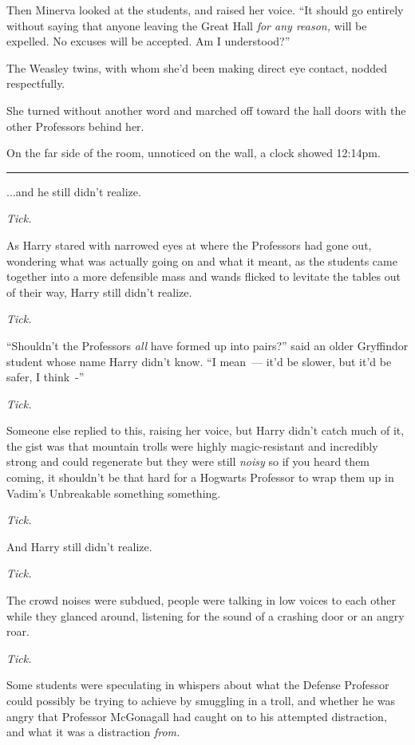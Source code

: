 Then Minerva looked at the students, and raised her voice. ``It should go entirely without saying that anyone leaving the Great Hall \emph{for any reason,} will be expelled. No excuses will be accepted. Am I understood?''

The Weasley twins, with whom she'd been making direct eye contact, nodded respectfully.

She turned without another word and marched off toward the hall doors with the other Professors behind her.

On the far side of the room, unnoticed on the wall, a clock showed 12:14pm.

\begin{center}\rule{3in}{0.4pt}\end{center}

...and he still didn't realize.

\emph{Tick.}

As Harry stared with narrowed eyes at where the Professors had gone out, wondering what was actually going on and what it meant, as the students came together into a more defensible mass and wands flicked to levitate the tables out of their way, Harry still didn't realize.

\emph{Tick.}

``Shouldn't the Professors \emph{all} have formed up into pairs?'' said an older Gryffindor student whose name Harry didn't know. ``I mean~--- it'd be slower, but it'd be safer, I think~-''

\emph{Tick.}

Someone else replied to this, raising her voice, but Harry didn't catch much of it, the gist was that mountain trolls were highly magic-resistant and incredibly strong and could regenerate but they were still \emph{noisy} so if you heard them coming, it shouldn't be that hard for a Hogwarts Professor to wrap them up in Vadim's Unbreakable something something.

\emph{Tick.}

And Harry still didn't realize.

\emph{Tick.}

The crowd noises were subdued, people were talking in low voices to each other while they glanced around, listening for the sound of a crashing door or an angry roar.

\emph{Tick.}

Some students were speculating in whispers about what the Defense Professor could possibly be trying to achieve by smuggling in a troll, and whether he was angry that Professor McGonagall had caught on to his attempted distraction, and what it was a distraction \emph{from.}

